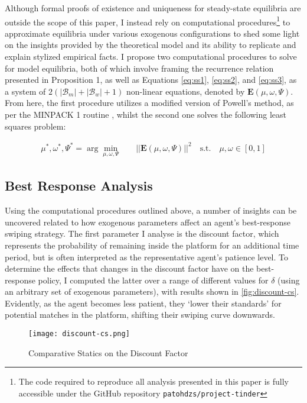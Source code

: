 Although formal proofs of existence and uniqueness for steady-state equilibria are outside the scope of this paper, I instead rely on computational procedures\footnote{The code required to reproduce all analysis presented in this paper is fully accessible under the GitHub repository \texttt{patohdzs/project-tinder}} to approximate equilibria under various exogenous configurations to shed some light on the insights provided by the theoretical model and its ability to replicate and explain stylized empirical facts. I propose two computational procedures to solve for model equilibria, both of which involve framing the recurrence relation presented in Proposition 1, as well as Equations \ref{eq:ss1}, \ref{eq:ss2}, and \ref{eq:ss3}, as a system of $2(|\mathcal{B}_m|+|\mathcal{B}_w|+1)$ non-linear equations, denoted by $\mathbf{E}(\mu,\omega,\Psi)$. From here, the first procedure utilizes a modified version of Powell's method, as per the MINPACK 1 routine \citep{more1980user}, whilst the second one solves the following least squares problem:

\begin{equation*}
    \begin{split} 
        \mu^*, \omega^*, \Psi^* = \arg\min_{\mu,\omega,\Psi} \quad &  ||\mathbf{E}(\mu,\omega,\Psi)||^2 \quad \textrm{s.t.} \quad  \mu, \omega  \in [0,1] 
    \end{split}
\end{equation*}
 

\subsection{Best Response Analysis}\label{sec:section3.2} 
Using the computational procedures outlined above, a number of insights can be uncovered related to how exogenous parameters affect an agent's best-response swiping strategy. The first parameter I analyse is the discount factor, which represents the probability of remaining inside the platform for an additional time period, but is often interpreted as the representative agent's patience level. To determine the effects that changes in the discount factor have on the best-response policy, I computed the latter over a range of different values for $\delta$ (using an arbitrary set of exogenous parameters), with results shown in \autoref{fig:discount-cs}. Evidently, as the agent becomes less patient, they `lower their standards' for potential matches in the platform, shifting their swiping curve downwards. 

\begin{figure}[ht] 
    \centering
    \caption{Comparative Statics on the Discount Factor}
    \texttt{[image: discount-cs.png]}
    \label{fig:discount-cs}
\end{figure} 

